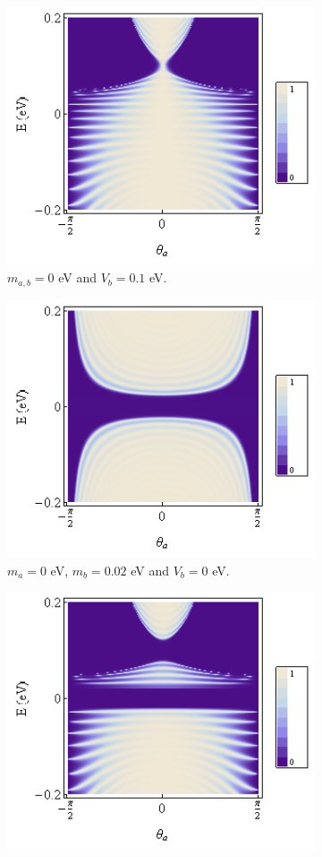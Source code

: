 \begin{figure}
	\begin{subfigure}{0.3\textwidth}
		\centerline{\includegraphics[scale=0.43]{images/potential}}
		\caption{$m_{a,b}=0$ eV and $V_{b}=0.1$ eV.}
	\end{subfigure}
	\hspace{0.5cm}
	\begin{subfigure}{0.3\textwidth}
		\centerline{\includegraphics[scale=0.43]{images/mass}}
		\caption{$m_{a}=0$ eV, $m_{b}=0.02$ eV and $V_{b}=0$ eV.}
	\end{subfigure}
	\hspace{0.5cm}
	\begin{subfigure}{0.3\textwidth}
		\centerline{\includegraphics[scale=0.43]{images/transmission}}

\end{subfigure}
\end{figure}

